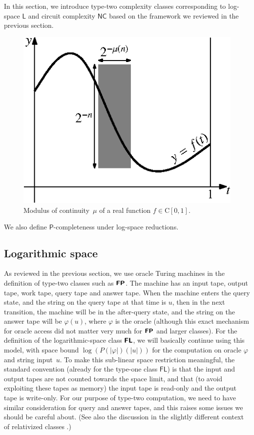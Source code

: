 \documentclass[conference]{IEEEtran}
\newcommand{\classonefont}[1]{\mathsf{#1}}
\newcommand{\classL}{\classonefont{L}}
\newcommand{\classFL}{\classonefont{FL}}
\newcommand{\classP}{\classonefont{P}}
\newcommand{\classNC}{\classonefont{NC}}
\newcommand{\classtwofont}[1]{\text{\bfseries \sffamily \upshape #1}}
\newcommand{\classFLtwo}{\classtwofont{FL}}
\newcommand{\classFPtwo}{\classtwofont{FP}}
\newcommand{\classC}{\mathrm C}
\theoremstyle{definition}
\theoremstyle{remark}
\begin{document}
In this section, we introduce type-two complexity classes
corresponding to log-space $\classL$ and circuit complexity $\classNC$
based on the framework we reviewed in the previous section.
\begin{figure}
\begin{center}
\includegraphics[scale=0.9]{./moc.eps}
\caption{Modulus of continuity~$\mu$ of a real function $f \in \classC [0, 1]$.}
\label{figure: moc}
\end{center}
\end{figure}
We also define $\classP$-completeness under log-space reductions.

\subsection{Logarithmic space}
\label{subsection: logspace}

As reviewed in the previous section, 
we use oracle Turing machines in the definition of type-two classes 
such as $\classFPtwo$. 
The machine has an input tape, output tape, work tape, query tape and answer tape. 
When the machine enters the query state, 
and the string on the query tape at that time is $u$, 
then in the next transition, 
the machine will be in the after-query state, and 
the string on the answer tape will be $\varphi (u)$, 
where $\varphi$ is the oracle
(although this exact mechanism for oracle access did not matter very much
for $\classFPtwo$ and larger classes). 
For the definition of 
the logarithmic-space class $\classFLtwo$, 
we will basically continue using this model, 
with space bound $\log (P (\lvert \varphi \rvert) (\lvert u \rvert))$
for the computation on oracle $\varphi$ and string input~$u$. 
To make this sub-linear space restriction meaningful, 
the standard convention (already for the type-one class $\classFL$) is that 
the input and output tapes are not counted towards the space limit, and that 
(to avoid exploiting these tapes as memory) 
the input tape is read-only and the output tape is write-only. 
For our purpose of type-two computation, 
we need to have similar consideration for query and answer tapes, 
and this raises some issues we should be careful about. 
(See also the discussion in the slightly different context of relativized classes 
\cite{aehlig2007relativizing,buss1988relativized,ladner1976relativization,wilson1988measure}.)
\end{document}
